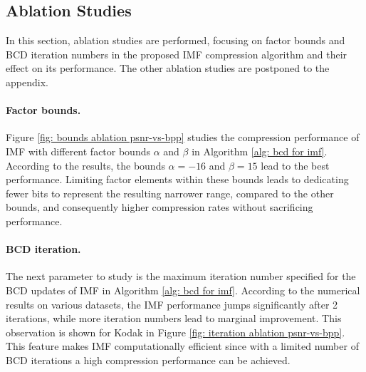 \subsection{Ablation Studies} \label{sec: ablation studies}
In this section, ablation studies are performed, focusing on factor bounds and BCD iteration numbers in the proposed IMF compression algorithm and their effect on its performance. The other ablation studies are postponed to the appendix.

\paragraph{Factor bounds.} 
Figure \ref{fig: bounds ablation psnr-vs-bpp} studies the compression performance of IMF with different factor bounds $\alpha$ and $\beta$ in Algorithm \ref{alg: bcd for imf}. According to the results, the bounds $\alpha=-16$ and $\beta=15$ lead to the best performance. Limiting factor elements within these bounds leads to dedicating fewer bits to represent the resulting narrower range, compared to the other bounds, and consequently higher compression rates without sacrificing performance. 

\paragraph{BCD iteration.}
The next parameter to study is the maximum iteration number specified for the BCD updates of IMF in Algorithm \eqref{alg: bcd for imf}. 
According to the numerical results on various datasets, the IMF performance jumps significantly after 2 iterations, while more iteration numbers lead to marginal improvement. 
This observation is shown for Kodak in Figure \ref{fig: iteration ablation psnr-vs-bpp}.
This feature makes IMF computationally efficient since with a limited number of BCD iterations a high compression performance can be achieved.


